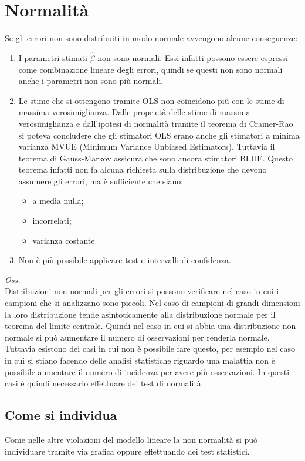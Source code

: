 \section{Normalità}
Se gli errori non sono distribuiti in modo normale avvengono alcune conseguenze:

\begin{enumerate}
	\item I parametri stimati $\hat{\beta}$ non sono normali. Essi infatti possono essere espressi come combinazione lineare degli errori, quindi se questi non sono normali anche i parametri non sono più normali.
	\item Le stime che si ottengono tramite OLS non coincidono più con le stime di massima verosimiglianza. Dalle proprietà delle stime di massima verosimiglianza e dall'ipotesi di normalità tramite il teorema di Cramer-Rao si poteva concludere che gli stimatori OLS erano anche gli stimatori a minima varianza MVUE (Minimum Variance Unbiased Estimators). Tuttavia il teorema di Gauss-Markov assicura che sono ancora stimatori BLUE. Questo teorema infatti non fa alcuna richiesta sulla distribuzione che devono assumere gli errori, ma è sufficiente che siano:
	\begin{itemize}
		\item a media nulla;
		\item incorrelati;
		\item varianza costante.
	\end{itemize}
	\item Non è più possibile applicare test e intervalli di confidenza.
\end{enumerate}

\textit{Oss.}\\
Distribuzioni non normali per gli errori si possono verificare nel caso in cui i campioni che si analizzano sono piccoli. Nel caso di campioni di grandi dimensioni la loro distribuzione tende asintoticamente alla distribuzione normale per il teorema del limite centrale. Quindi nel caso in cui si abbia una distribuzione non normale si può aumentare il numero di osservazioni per renderla normale. Tuttavia esistono dei casi in cui non è possibile fare questo, per esempio nel caso in cui si stiano facendo delle analisi statistiche riguardo una malattia non è possibile aumentare il numero di incidenza per avere più osservazioni. In questi casi è quindi necessario effettuare dei test di normalità.

\subsection{Come si individua}
Come nelle altre violazioni del modello lineare la non normalità si può individuare tramite via grafica oppure effettuando dei test statistici.

